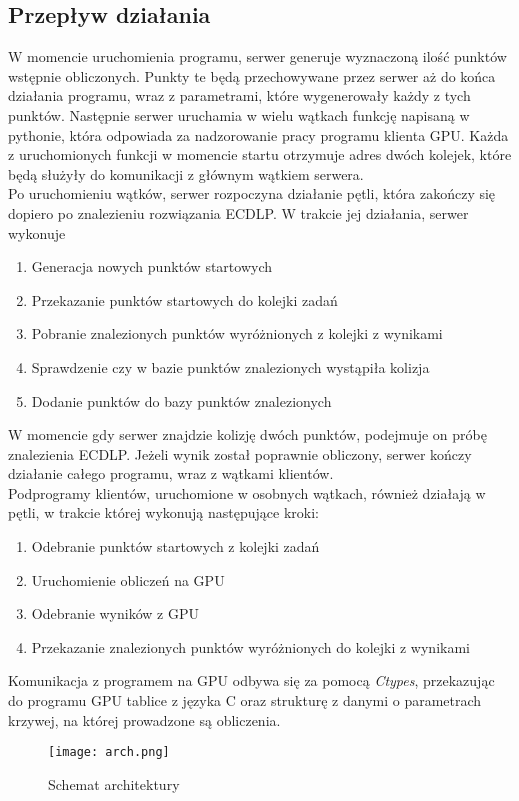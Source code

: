 \subsection{Przepływ działania}
W momencie uruchomienia programu, serwer generuje wyznaczoną ilość punktów wstępnie obliczonych.
Punkty te będą przechowywane przez serwer aż do końca działania programu, wraz z parametrami, które
wygenerowały każdy z tych punktów. Następnie serwer uruchamia w wielu wątkach funkcję napisaną w pythonie, która
odpowiada za nadzorowanie pracy programu klienta GPU. Każda z uruchomionych funkcji w momencie startu
otrzymuje adres dwóch kolejek, które będą służyły do komunikacji z głównym wątkiem serwera. \\
Po uruchomieniu wątków, serwer rozpoczyna działanie pętli, która zakończy się dopiero po znalezieniu
rozwiązania ECDLP. W trakcie jej działania, serwer wykonuje
\begin{enumerate}
    \item Generacja nowych punktów startowych
    \item Przekazanie punktów startowych do kolejki zadań
    \item Pobranie znalezionych punktów wyróżnionych z kolejki z wynikami
    \item Sprawdzenie czy w bazie punktów znalezionych wystąpiła kolizja
    \item Dodanie punktów do bazy punktów znalezionych
\end{enumerate}
W momencie gdy serwer znajdzie kolizję dwóch punktów, podejmuje on próbę znalezienia ECDLP.
Jeżeli wynik został poprawnie obliczony, serwer kończy działanie całego programu, wraz z wątkami klientów. \\
Podprogramy klientów, uruchomione w osobnych wątkach,
również działają w pętli, w trakcie której wykonują następujące kroki:
\begin{enumerate}
    \item Odebranie punktów startowych z kolejki zadań
    \item Uruchomienie obliczeń na GPU
    \item Odebranie wyników z GPU
    \item Przekazanie znalezionych punktów wyróżnionych do kolejki z wynikami
\end{enumerate}
Komunikacja z programem na GPU odbywa się za pomocą \textit{Ctypes}, przekazując
do programu GPU tablice z języka C oraz strukturę z danymi o parametrach krzywej,
na której prowadzone są obliczenia.

\begin{figure}[!h]
    \centering \texttt{[image: arch.png]}
    \caption{Schemat architektury}
\end{figure}
